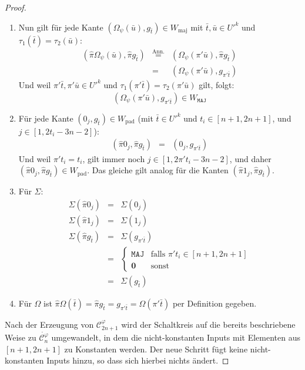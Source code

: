 \begin{proof}
\begin{description}
\begin{enumerate}
\item Nun gilt für jede Kante $\left(\Omega_{\psi}\left(\bar{u}\right),g_{\bar{t}}\right)\in W_{\mathrm{maj}}$
mit $\bar{t},\bar{u}\in U'^{k}$ und $\tau_{1}\left(\bar{t}\right)=\tau_{2}\left(\bar{u}\right)$:
\begin{eqnarray*}
\left(\hat{\pi}\Omega_{\psi}\left(\bar{u}\right),\hat{\pi}g_{\bar{t}}\right) & \overset{\mathrm{Ann.}}{=} & \left(\Omega_{\psi}\left(\pi'\bar{u}\right),\hat{\pi}g_{\bar{t}}\right)\\
 & = & \left(\Omega_{\psi}\left(\pi'\bar{u}\right),g_{\pi'\bar{t}}\right)
\end{eqnarray*}
Und weil $\pi'\bar{t},\pi'\bar{u}\in U'^{k}$ und $\tau_{1}\left(\pi'\bar{t}\right)=\tau_{2}\left(\pi'\bar{u}\right)$
gilt, folgt:
\[
\left(\Omega_{\psi}\left(\pi'\bar{u}\right),g_{\pi'\bar{t}}\right)\in W_{\mathtt{MAJ}}
\]
\item Für jede Kante $\left(0_{j},g_{\bar{t}}\right)\in W_{\mathrm{pad}}$
(mit $\bar{t}\in U'^{k}$ und $t_{i}\in\left[n+1,2n+1\right]$, und
$j\in\left[1,2t_{i}-3n-2\right]$):
\begin{eqnarray*}
\left(\hat{\pi}0_{j},\hat{\pi}g_{\bar{t}}\right) & = & \left(0_{j},g_{\pi'\bar{t}}\right)
\end{eqnarray*}
Und weil $\pi't_{i}=t_{i}$, gilt immer noch $j\in\left[1,2\pi't_{i}-3n-2\right]$,
und daher $\left(\hat{\pi}0_{j},\hat{\pi}g_{\bar{t}}\right)\in W_{\mathrm{pad}}$.
Das gleiche gilt analog für die Kanten $\left(\hat{\pi}1_{j},\hat{\pi}g_{\bar{t}}\right)$.
\item Für $\Sigma$:
\begin{eqnarray*}
\Sigma\left(\hat{\pi}0_{j}\right) & = & \Sigma\left(0_{j}\right)\\
\Sigma\left(\hat{\pi}1_{j}\right) & = & \Sigma\left(1_{j}\right)\\
\Sigma\left(\hat{\pi}g_{\bar{t}}\right) & = & \Sigma\left(g_{\pi'\bar{t}}\right)\\
 & = & \begin{cases}
\mathtt{MAJ} & \mathrm{falls}\,\,\pi't_{i}\in\left[n+1,2n+1\right]\\
\mathbf{0} & \mathrm{sonst}
\end{cases}\\
 & = & \Sigma\left(g_{\bar{t}}\right)
\end{eqnarray*}
\item Für $\Omega$ ist $\hat{\pi}\Omega\left(\bar{t}\right)=\hat{\pi}g_{\bar{t}}=g_{\pi'\bar{t}}=\Omega\left(\pi'\bar{t}\right)$
per Definition gegeben.
\end{enumerate}
\end{description}
Nach der Erzeugung von $\mathcal{C}_{2n+1}^{\varphi}$ wird der Schaltkreis
auf die bereits beschriebene Weise zu $\dot{\mathcal{C}_{n}^{\varphi}}$
umgewandelt, in dem die nicht-konstanten Inputs mit Elementen aus
$\left[n+1,2n+1\right]$ zu Konstanten werden. Der neue Schritt fügt
keine nicht-konstanten Inputs hinzu, so dass sich hierbei nichts ändert.


\end{proof}
